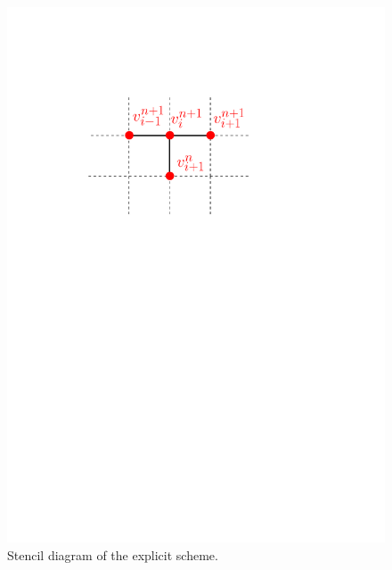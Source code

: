 \begin{figure}[H]
  \centering
  \includegraphics[scale=.8]{chapters/chapter3/ExplicitStencil.pdf}
  \caption{Stencil diagram of the explicit scheme.}
  \label{fig:finitedifferencesschemes:explicit_stencil}
\end{figure}

